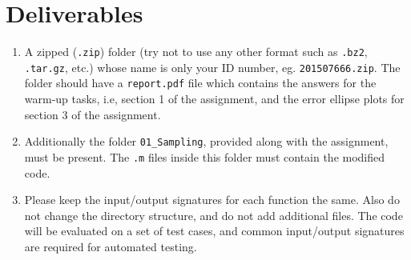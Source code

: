 \documentclass{article}
\begin{document}
\section{Deliverables}
\begin{enumerate}
\item A zipped (\texttt{.zip}) folder (try not to use any other format such as \texttt{.bz2}, \texttt{.tar.gz}, etc.) whose name is only your ID number, eg. \texttt{201507666.zip}. The folder should have a \texttt{report.pdf} file which contains the answers for the warm-up tasks, i.e, section 1 of the assignment, and the error ellipse plots for section 3 of the assignment.
\item Additionally the folder \texttt{01\_Sampling}, provided along with the assignment, must be present. The \texttt{.m} files inside this folder must contain the modified code.
\item Please keep the input/output signatures for each function the same. Also do not change the directory structure, and do not add additional files. The code will be evaluated on a set of test cases, and common input/output signatures are required for automated testing.
\end{enumerate}
\end{document}
